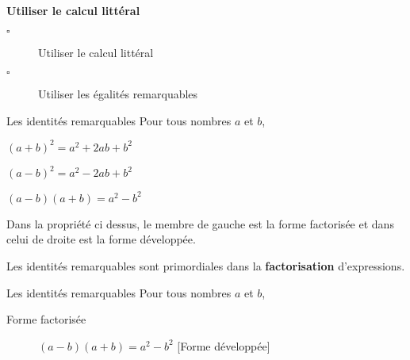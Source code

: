 \documentclass[openany]{book}
\begin{document}
\begin{seance}

\end{seance}


\begin{CpsCol}
\textbf{Utiliser le calcul littéral}
\begin{description}
\item[$\square$] Utiliser le calcul littéral
\item[$\square$] Utiliser les égalités remarquables
\end{description}
\end{CpsCol}






\begin{ThT}{Les identités remarquables}
Pour tous nombres $a$ et $b$, 
\begin{description}
\item $(a+b)^2=a^2+2ab+b^2$
\item $(a-b)^2=a^2-2ab+b^2$
\item $(a-b)(a+b)=a^2-b^2$
\end{description}
\end{ThT}

\begin{Rq}
Dans la propriété ci dessus, le membre de gauche est la forme factorisée et dans celui de droite est la forme développée.
\end{Rq}





\begin{seance}

\end{seance}

\begin{Rq}
Les identités remarquables sont primordiales dans la \textbf{factorisation} d'expressions.
\end{Rq}

\begin{ThT}{Les identités remarquables}
Pour tous nombres $a$ et $b$, 
\begin{description}
\item [Forme factorisée] $(a-b)(a+b)=a^2-b^2$ [Forme développée] 
\end{description}
\end{ThT}
\end{document}
